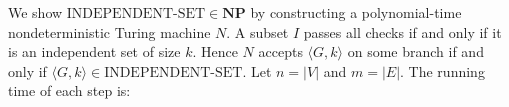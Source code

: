 \documentclass[12pt,a4paper,openany]{article}
\begin{document}
\begin{center}
\end{center}

We show $\text{INDEPENDENT-SET} \in \mathbf{NP}$ by constructing a polynomial-time nondeterministic Turing machine $N$.
A subset $I$ passes all checks if and only if it is an independent set of size $k$. Hence $N$ accepts $\langle G, k \rangle$ on some branch if and only if $\langle G, k \rangle \in \text{INDEPENDENT-SET}$.
Let $n = |V|$ and $m = |E|$. The running time of each step is:
\end{document}
